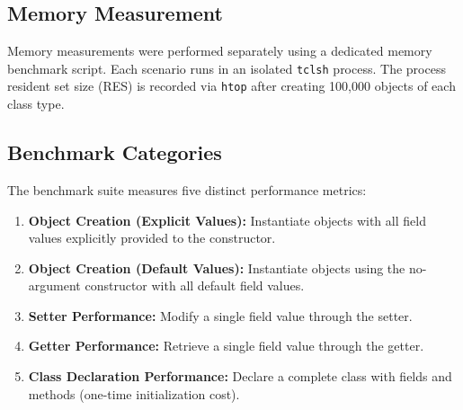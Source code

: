 \subsection*{Memory Measurement}

Memory measurements were performed separately using a dedicated memory benchmark script.
Each scenario runs in an isolated \texttt{tclsh} process. The process resident set size
(RES) is recorded via \texttt{htop} after creating 100,000 objects of each class type.

\subsection*{Benchmark Categories}

The benchmark suite measures five distinct performance metrics:
\begin{enumerate}
  \item \textbf{Object Creation (Explicit Values):} Instantiate objects with all field
        values explicitly provided to the constructor.
  \item \textbf{Object Creation (Default Values):} Instantiate objects using the
        no-argument constructor with all default field values.
  \item \textbf{Setter Performance:} Modify a single field value through the setter.
  \item \textbf{Getter Performance:} Retrieve a single field value through the getter.
  \item \textbf{Class Declaration Performance:} Declare a complete class with fields and
        methods (one-time initialization cost).
\end{enumerate}
